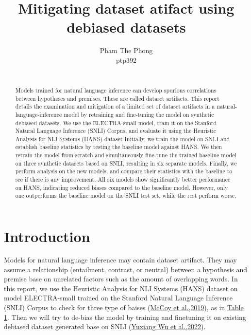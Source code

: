 \documentclass{article}
\title{Mitigating dataset atifact using debiased datasets}
\author{%
  Pham The Phong \\
  ptp392\\
   \\
}
\begin{document}
\maketitle


\begin{abstract}


 Models trained for natural language inference can develop spurious correlations between hypotheses and premises.
 These are called dataset artifacts.
  This report details the examination and mitigation of a limited set of dataset artifacts in a natural-language-inference model by retraining and fine-tuning the model on synthetic debiased datasets.
 We use the ELECTRA-small model, train it on the Stanford Natural Language Inference (SNLI) Corpus, and evaluate it using the Heuristic Analysis for NLI Systems (HANS) dataset
 Initially, we train the model on SNLI and establish baseline statistics by testing the baseline model against HANS.
  We then retrain the model from scratch and simultaneously fine-tune the trained baseline model on three synthetic datasets based on SNLI, resulting in six separate models.
  Finally, we perform analysis on the new models, and compare their statistics with the baseline to see if there is any improvement.
  All six models show significantly better performance on HANS, indicating reduced biases compared to the baseline model.
  However, only one outperforms the baseline model on the SNLI test set, while the rest perform worse.

\end{abstract}


\section{Introduction}
Models for natural language inference may contain dataset artifact.
They may assume a relationship (entailment, contrast, or neutral) between a hypothesis and premise base on unrelated factors such as the amount of overlapping words.
In this report, we use the Heuristic Analysis for NLI Systems (HANS) dataset on model ELECTRA-small trained on the Stanford Natural Language Inference (SNLI) Corpus to check for three type of baises (\hyperref[ref1]{McCoy et al.,2019}), as in \hyperref[table1]{Table 1}. Then we will try to de-bias the model by training and finetuning it on existing debiased dataset generated base on SNLI (\hyperref[ref2]{Yuxiang Wu et al.,2022}).
\end{document}
